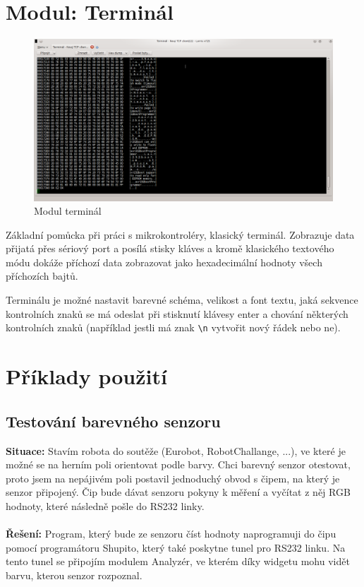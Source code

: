 \documentclass[12pt, a4paper, oneside]{article}
\begin{document}
\newpage
\section{Modul: Terminál}
\begin{figure}[H]
\begin{center}
\includegraphics[width=\textwidth]{img/terminal.png}
\caption{Modul terminál}
\label{Terminal}
\end{center}
\end{figure}
Základní pomůcka při práci s mikrokontroléry, klasický terminál. Zobrazuje data přijatá přes sériový port a posílá stisky kláves a kromě klasického textového módu dokáže příchozí data zobrazovat jako hexadecimální hodnoty všech příchozích bajtů.

Terminálu je možné nastavit barevné schéma, velikost a font textu, jaká sekvence kontrolních znaků se má odeslat při stisknutí klávesy enter a chování některých kontrolních znaků (například jestli má znak \verb|\n| vytvořit nový řádek nebo ne).

\newpage
\section{Příklady použití}
\subsection{Testování barevného senzoru}
{\bf Situace:} Stavím robota do soutěže (Eurobot, RobotChallange, ...), ve které je možné se na herním poli orientovat podle barvy. Chci barevný senzor otestovat, proto jsem na nepájivém poli postavil jednoduchý obvod s čipem, na který je senzor připojený. Čip bude dávat senzoru pokyny k měření a vyčítat z něj RGB hodnoty, které následně pošle do RS232 linky.\\
\\
{\bf Řešení:} Program, který bude ze senzoru číst hodnoty naprogramuji do čipu pomocí programátoru Shupito, který také poskytne tunel pro RS232 linku. Na tento tunel se připojím modulem Analyzér, ve kterém díky widgetu  mohu vidět barvu, kterou senzor rozpoznal.
\end{document}
